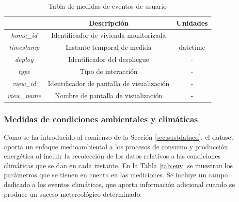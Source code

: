 \vspace{3mm}

\begin{table}[h!]
    \centering
    \begin{tabular}{|c|c|c|}
    \hline
    \rowcolor[HTML]{AAAAAA} 
    \multicolumn{1}{|c|}{\cellcolor[HTML]{AAAAAA}Campo} & \multicolumn{1}{c|}{\cellcolor[HTML]{AAAAAA}Descripción} & Unidades \\ \hline
    \textit{home\_id} & Identificador de vivienda monitorizada & - \\ \hline
    \textit{timestamp} & Instante temporal de medida & datetime \\ \hline
    \textit{deploy} & Identificador del despliegue & - \\ \hline
    \textit{type} & Tipo de interacción & - \\ \hline
    \textit{view\_id} & Identificador de pantalla de visualización & - \\ \hline
    \textit{view\_name} & Nombre de pantalla de visualización & - \\ \hline
    \end{tabular}
    \caption{Tabla de medidas de eventos de usuario \cite{sustdata}}
    \label{tab:users}
\end{table}

\subsubsection{Medidas de condiciones ambientales y climáticas}

Como se ha introducido al comienzo de la Sección \ref{sec:sustdataed}, el dataset aporta un enfoque medioambiental a los procesos de consumo y producción energética al incluir la recolección de los datos relativos a las condiciones climáticas que se dan en cada instante. En la Tabla \ref{tab:env} se muestran los parámetros que se tienen en cuenta en las mediciones. Se incluye un campo dedicado a los eventos climáticos, que aporta información adicional cuando se produce un suceso metereológico determinado.

\vspace{3mm}

